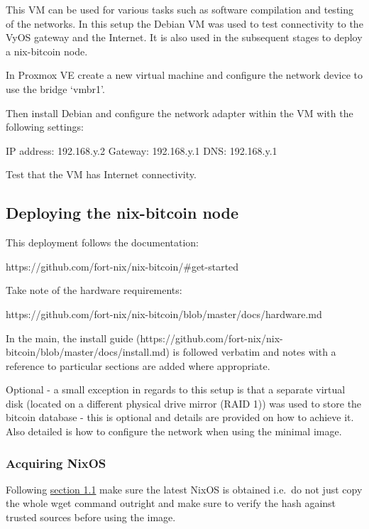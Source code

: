 This VM can be used for various tasks such as software compilation and
testing of the networks. In this setup the Debian VM was used to test
connectivity to the VyOS gateway and the Internet. It is also used in
the subsequent stages to deploy a nix-bitcoin node.

In Proxmox VE create a new virtual machine and configure the network
device to use the bridge `vmbr1'.

Then install Debian and configure the network adapter within the VM with
the following settings:

IP address: 192.168.y.2 Gateway: 192.168.y.1 DNS: 192.168.y.1

Test that the VM has Internet connectivity.

\hypertarget{deploying-the-nix-bitcoin-node}{%
\subsection{Deploying the nix-bitcoin
node}\label{deploying-the-nix-bitcoin-node}}

This deployment follows the documentation:

https://github.com/fort-nix/nix-bitcoin/\#get-started

Take note of the hardware requirements:

https://github.com/fort-nix/nix-bitcoin/blob/master/docs/hardware.md

In the main, the install guide
(https://github.com/fort-nix/nix-bitcoin/blob/master/docs/install.md) is
followed verbatim and notes with a reference to particular sections are
added where appropriate.

Optional - a small exception in regards to this setup is that a separate
virtual disk (located on a different physical drive mirror (RAID 1)) was
used to store the bitcoin database - this is optional and details are
provided on how to achieve it. Also detailed is how to configure the
network when using the minimal image.

\hypertarget{acquiring-nixos}{%
\subsubsection{Acquiring NixOS}\label{acquiring-nixos}}

Following
\href{https://github.com/fort-nix/nix-bitcoin/blob/master/docs/install.md\#1-nixos-installation}{section
1.1} make sure the latest NixOS is obtained i.e.~do not just copy the
whole wget command outright and make sure to verify the hash against
trusted sources before using the image.

